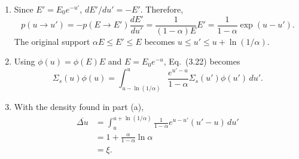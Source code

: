 \begin{adaptedsolution}
\begin{enumerate}[label=(\alph*)]
\item Since $E'=E_0e^{-u'}$, $dE'/du'=-E'$.  Therefore,
\[
 p(u\to u')
 =-p(E\to E')\frac{dE'}{du'}
 =\frac{1}{(1-\alpha)E}E'
 =\frac{1}{1-\alpha}\exp(u-u').
\]
The original support $\alpha E\le E'\le E$ becomes
$u\le u'\le u+\ln(1/\alpha)$.
\item Using $\phi(u)=\phi(E)E$ and $E=E_0e^{-u}$, Eq.~(3.22) becomes
\[
 \boxed{\Sigma_s(u)\phi(u)
 =\int_{u-\ln(1/\alpha)}^{u}
  \frac{e^{u'-u}}{1-\alpha}\Sigma_s(u')\phi(u')\,du'}.
\]
\item With the density found in part (a),
\begin{align*}
 \overline{\Delta u}
 &=\int_u^{u+\ln(1/\alpha)}
   \frac{1}{1-\alpha}e^{u-u'}(u'-u)\,du'\\
 &=1+\frac{\alpha}{1-\alpha}\ln\alpha\\
 &=\boxed{\xi}.
\end{align*}
\end{enumerate}
\end{adaptedsolution}

\clearpage
